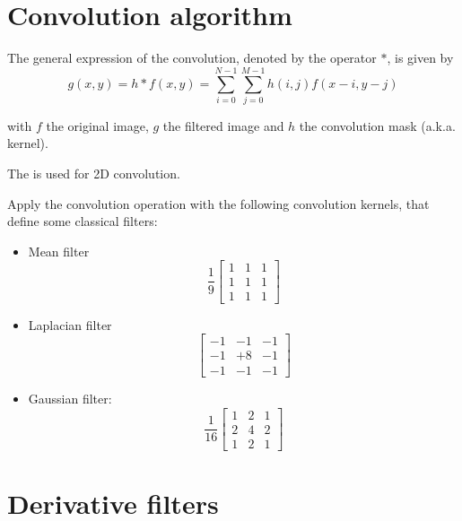\section{Convolution algorithm}

The general expression of the convolution, denoted by the operator $*$, is given by
$$g(x,y)= h *f(x,y)=\sum_{i=0}^{N-1}{\sum_{j=0}^{M-1}{ h(i, j)f(x-i,y-j)}}$$

with $f$ the original image, $g$ the filtered image and $h$ the convolution mask (a.k.a. kernel). 

\begin{pcomment}
The  is used for 2D convolution.
\end{pcomment}

\begin{qbox} Apply the convolution operation with the following convolution kernels, that define some classical filters:
 \begin{itemize}
 \item Mean filter
 $$\frac{1}{9}
\left[
\begin{array}{ccc}
1&1&1\\
1&1&1\\
1&1&1
\end{array}
\right]
$$
  \item Laplacian filter
$$
\left[
\begin{array}{ccc}
-1&-1&-1\\
-1&+8&-1\\
-1&-1&-1
\end{array}
\right]
$$

\item Gaussian filter:
$$\frac{1}{16}
\left[
\begin{array}{ccc}
1&2&1\\
2&4&2\\
1&2&1
\end{array}
\right]
$$
 \end{itemize}

\end{qbox}


\section{Derivative filters}


